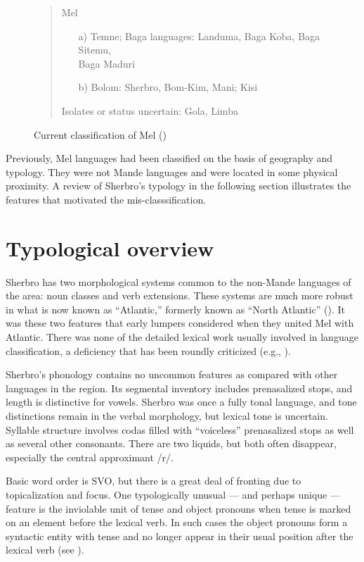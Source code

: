 \begin{figure}
\caption{Current classification of Mel (\citealt{Childs2024a})}
\label{figex:intro:2}
\begin{quote}
    Mel
\begin{itemize} \leftskip=0.25in
\item[a)] Temne; Baga languages: Landuma, Baga Koba, Baga Sitemu,\\
Baga Maduri
\item[b)] Bolom: Sherbro, Bom-Kim, Mani; Kisi
\end{itemize}
\leftskip=0.6in 
Isolates or status uncertain: Gola, Limba
\end{quote} 
\end{figure}

Previously, Mel languages had been classified on the basis of geography and typology. They were not Mande languages and were located in some physical proximity. A review of Sherbro's typology in the following section illustrates the features that motivated the mis-classsification.

\section{Typological overview}
\label{sec:1.5}\hypertarget{Toc115517747}{}
Sherbro has two morphological systems common to the non-Mande languages of the area: noun classes and verb extensions. These systems are much more robust in what is now known as “Atlantic,” formerly known as “North Atlantic” (\citealt{Segerer2016}). It was these two features that early lumpers considered when they united Mel with Atlantic. There was none of the detailed lexical work usually involved in language classification, a deficiency that has been roundly criticized (e.g., \citealt{Dixon1997}).

Sherbro's phonology contains no uncommon features as compared with other languages in the region. Its segmental inventory includes prenasalized stops, and length is distinctive for vowels. Sherbro was once a fully tonal language, and tone distinctions remain in the verbal morphology, but lexical tone is uncertain. Syllable structure involves codas filled with “voiceless” prenasalized stops as well as several other consonants. There are two liquids, but both often disappear, especially the central approximant /r/.

Basic word order is SVO, but there is a great deal of fronting due to topicalization and focus. One typologically unusual — and perhaps unique —feature is the inviolable unit of tense and object pronouns when tense is marked on an element before the lexical verb. In such cases the object pronouns form a syntactic entity with tense and no longer appear in their usual position after the lexical verb (see ).

